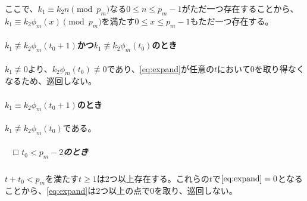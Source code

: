 \documentclass[platex]{jsarticle}
\newcommand{\ssubparagraph}[1]{\subparagraph{$\quad$□ #1}}
\begin{document}
ここで、$k_1 \equiv k_2 n \pmod{p_m}$なる$0\leq n \leq p_m-1$がただ一つ存在することから、$k_1 \equiv k_2 \phi_m(x) \pmod{p_m}$を満たす$0\leq x \leq p_m-1$もただ一つ存在する。

\paragraph{$k_1 \not\equiv k_2 \phi_m(t_0+1)$かつ$k_1 \not\equiv k_2 \phi_m(t_0)$のとき}
$k_1 \not\equiv 0$より、$k_2\phi_m(t_0) \not\equiv 0$であり、\eqref{eq:expand}が任意の$t$において0を取り得なくなるため、巡回しない。

\paragraph{$k_1 \equiv k_2 \phi_m(t_0+1)$のとき}
$k_1 \not\equiv k_2 \phi_m(t_0)$である。

\ssubparagraph{$t_0 < p_m-2$のとき}
$t+t_0<p_m$を満たす$t\geq 1$は2つ以上存在する。これらの$t$で$\eqref{eq:expand}=0$となることから、\eqref{eq:expand}は2つ以上の点で0を取り、巡回しない。
\end{document}
